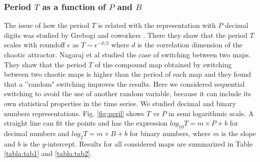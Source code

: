 \subsubsection{Period $T$ as a function of $P$ and $B$}
The issue of how the period $T$ is related with the representation with $P$ decimal digits was studied by Grebogi and coworkers \cite{Grebogi1988}. There they shaw that the period $T$ scales with roundoff $\epsilon$ as
$T\sim\epsilon^{-d/2}$ where $d$ is the correlation dimension of
the chaotic attractor. Nagaraj et al \cite{Nagaraj2008} studied the case of switching between two maps. They shaw that the period $T$ of the
compound map obtained by switching between two chaotic maps is
higher than the period of each map and they found that a ''random" switching improves the results. Here we considered  sequential switching to avoid the use of another random variable, because it can include its own statistical properties in the time series. We studied decimal and binary numbers representations. Fig. \ref{fig:peril} shows  $T$ vs $P$ in semi logarithmic scale. 
A straight line can fit the points and has the expression  $log_{10}T=m \times P + b$ for decimal numbers and  $log_{2}T=m \times B + b$ for binary numbers, where $m$ is the slope and $b$ is the $y$-intercept. Results for all considered maps are summarized in Table \ref{tabla:tab1} and \ref{tabla:tab2}.

